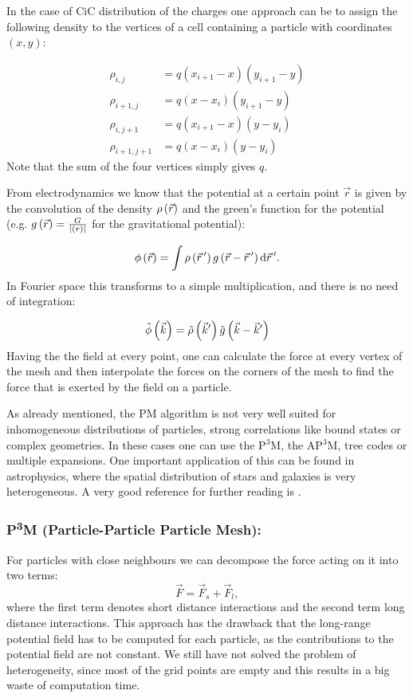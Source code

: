 In the case of CiC distribution of the charges one approach can be to assign the following density to the vertices of a cell containing a particle with coordinates $(x,y)$:

\begin{align*}
\rho_{i,j} &= q(x_{i+1}-x)(y_{i+1}-y) \\
\rho_{i+1,j} &= q(x-x_{i})(y_{i+1}-y) \\
\rho_{i,j+1} &= q(x_{i+1}-x)(y-y_{i}) \\
\rho_{i+1,j+1} &= q(x-x_{i})(y-y_{i}) 
\end{align*}
Note that the sum of the four vertices simply gives $q$.


From electrodynamics we know that the potential at a certain point $\vec{r}$ is given by the convolution of the density $\rho\left(\vec{r}\right)$ and the green's function for the potential (e.g. $g\left(\vec{r}\right)= \frac{G}{\left|\left(r\right)\right|}$ for the gravitational potential):

\begin{equation}
\phi\left(\vec{r}\right) = \int \rho \left(\vec{r}\,'\right)g\left(\vec{r}-\vec{r}\,'\right)\text{d}\vec{r}\,'.
\end{equation}
In Fourier space this transforms to a simple multiplication, and there is no need of integration:

\begin{equation}
\tilde{\phi}\left(\vec{k}\right) = \tilde{\rho} \left(\vec{k}'\right)\tilde{g}\left(\vec{k}-\vec{k}'\right)
\end{equation}
Having the the field at every point, one can calculate the force at every vertex of the mesh and then interpolate  the forces on the corners of the mesh to find the force that is exerted by the field on a particle.


As already mentioned, the PM algorithm is  not very well suited for inhomogeneous distributions of particles, strong correlations like bound states or complex geometries. In these cases one can use  the P$^3$M, the AP$^3$M, tree codes or multiple expansions. One important application of this can be found in astrophysics, where the spatial distribution of stars and galaxies is very heterogeneous. A very good reference for further reading is \citet{pfalzner}.

\subsubsection*{P\textsuperscript{3}M (Particle-Particle Particle Mesh):}

For particles with close neighbours we can decompose the force acting on it into two terms:
\begin{equation}
\vec{F} = \vec{F}_s + \vec{F}_l,
\end{equation}
where the first term denotes short distance interactions and the second term  long distance interactions. This approach has the drawback that the long-range potential field has to be computed for each particle, as the contributions to the potential field are not constant. We still have not solved the problem of heterogeneity, since most of the grid points are empty and this results in a big waste of computation time.

